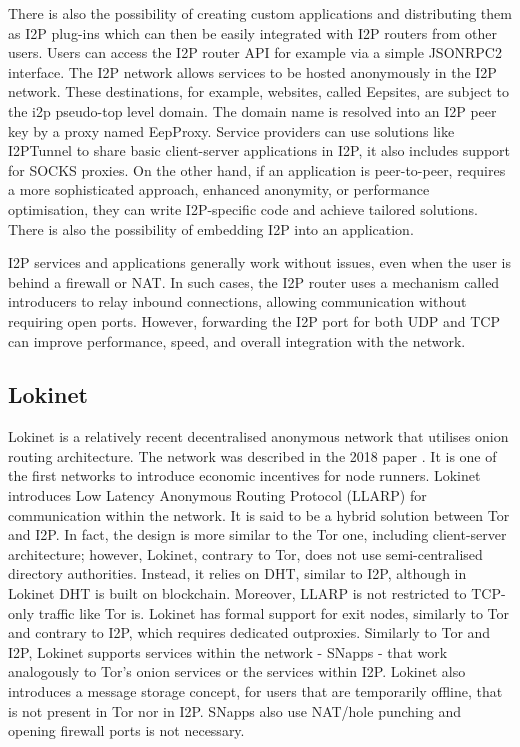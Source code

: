 There is also the possibility of creating custom applications and distributing them as I2P plug-ins which can then be easily integrated with I2P routers from other users. Users can access the I2P router API for example via a simple JSONRPC2 interface. 
The I2P network allows services to be hosted anonymously in the I2P network. These destinations, for example, websites, called Eepsites, are subject to the i2p pseudo-top level domain. The domain name is resolved into an I2P peer key by a proxy named EepProxy. Service providers can use solutions like I2PTunnel to share basic client-server applications in I2P, it also includes support for SOCKS proxies. On the other hand, if an application is peer-to-peer, requires a more sophisticated approach, enhanced anonymity, or performance optimisation, they can write I2P-specific code and achieve tailored solutions. There is also the possibility of embedding I2P into an application.

I2P services and applications generally work without issues, even when the user is behind a firewall or NAT. In such cases, the I2P router uses a mechanism called introducers to relay inbound connections, allowing communication without requiring open ports. However, forwarding the I2P port for both UDP and TCP can improve performance, speed, and overall integration with the network.

\subsection{Lokinet}
Lokinet is a relatively recent decentralised anonymous network that utilises onion routing architecture. The network was described in the 2018 paper \cite{loki}. It is one of the first networks to introduce economic incentives for node runners. Lokinet introduces Low Latency Anonymous Routing Protocol (LLARP) for communication within the network. It is said to be a hybrid solution between Tor and I2P. In fact, the design is more similar to the Tor one, including client-server architecture; however, Lokinet, contrary to Tor, does not use semi-centralised directory authorities. Instead, it relies on DHT, similar to I2P, although in Lokinet DHT is built on blockchain. Moreover, LLARP is not restricted to TCP-only traffic like Tor is. Lokinet has formal support for exit nodes, similarly to Tor and contrary to I2P, which requires dedicated outproxies. Similarly to Tor and I2P, Lokinet supports services within the network - SNapps - that work analogously to Tor’s onion services or the services within I2P. Lokinet also introduces a message storage concept, for users that are temporarily offline, that is not present in Tor nor in I2P. SNapps also use NAT/hole punching and opening firewall ports is not necessary.

